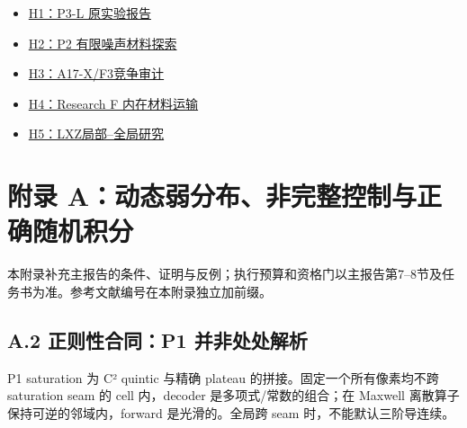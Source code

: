 \documentclass[
  11pt,
  a4paper,
]{article}
\providecommand{\tightlist}{%
  \setlength{\itemsep}{0pt}\setlength{\parskip}{0pt}}
\begin{document}
\begin{itemize}
\tightlist
\item
  \href{https://github.com/migodam/b1-probabilistic-maxwell-imaging/blob/6eadb4690c962aaa95821fc4056b677f0f924a6b/research/p3l_local_posterior_imaging/RESEARCH_REPORT_ZH.md}{H1：P3-L
  原实验报告}
\item
  \href{https://github.com/migodam/b1-probabilistic-maxwell-imaging/blob/6eadb4690c962aaa95821fc4056b677f0f924a6b/research/p2_material_fiber_20261019/RESEARCH_REPORT_ZH.md}{H2：P2
  有限噪声材料探索}
\item
  \href{https://github.com/migodam/b1-probabilistic-maxwell-imaging/blob/6eadb4690c962aaa95821fc4056b677f0f924a6b/research/a17x_f3_competition_audit/RESEARCH_REPORT_ZH.md}{H3：A17-X/F3竞争审计}
\item
  \href{https://github.com/migodam/b1-probabilistic-maxwell-imaging/blob/6eadb4690c962aaa95821fc4056b677f0f924a6b/research/research_f_intrinsic_transport/RESEARCH_REPORT_ZH.md}{H4：Research
  F 内在材料运输}
\item
  \href{https://github.com/migodam/b1-probabilistic-maxwell-imaging/blob/6eadb4690c962aaa95821fc4056b677f0f924a6b/research/research_lxz_20261016/RESEARCH_REPORT_ZH.md}{H5：LXZ局部--全局研究}
\end{itemize}

\hypertarget{ux9644ux5f55-aux52a8ux6001ux5f31ux5206ux5e03ux975eux5b8cux6574ux63a7ux5236ux4e0eux6b63ux786eux968fux673aux79efux5206}{%
\section{附录
A：动态弱分布、非完整控制与正确随机积分}\label{ux9644ux5f55-aux52a8ux6001ux5f31ux5206ux5e03ux975eux5b8cux6574ux63a7ux5236ux4e0eux6b63ux786eux968fux673aux79efux5206}}

本附录补充主报告的条件、证明与反例；执行预算和资格门以主报告第7--8节及任务书为准。参考文献编号在本附录独立加前缀。

\hypertarget{a.2-ux6b63ux5219ux6027ux5408ux540cp1-ux5e76ux975eux5904ux5904ux89e3ux6790}{%
\subsection{A.2 正则性合同：P1
并非处处解析}\label{a.2-ux6b63ux5219ux6027ux5408ux540cp1-ux5e76ux975eux5904ux5904ux89e3ux6790}}

P1 saturation 为 C² quintic 与精确 plateau
的拼接。固定一个所有像素均不跨 saturation seam 的 cell 内，decoder
是多项式/常数的组合；在 Maxwell 离散算子保持可逆的邻域内，forward
是光滑的。全局跨 seam 时，不能默认三阶导连续。
\end{document}
